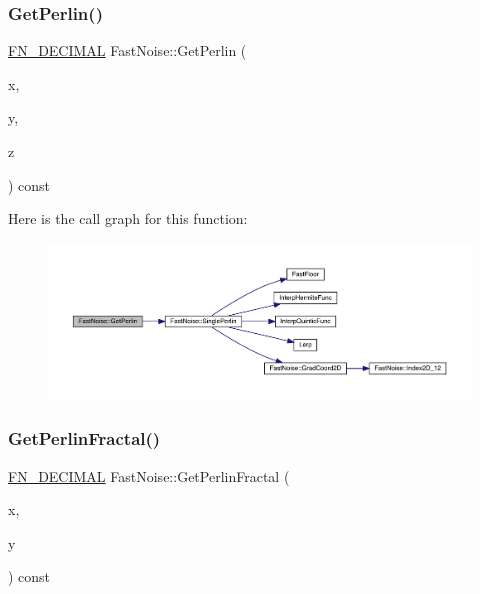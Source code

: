 \subsubsection{\texorpdfstring{Get\+Perlin()}{GetPerlin()}\hspace{0.1cm}{\footnotesize\ttfamily [2/2]}}
{\footnotesize\ttfamily \mbox{\hyperlink{_fast_noise_8h_a75a9ef6d2541c4921815b885bfd449c3}{F\+N\+\_\+\+D\+E\+C\+I\+M\+AL}} Fast\+Noise\+::\+Get\+Perlin (\begin{DoxyParamCaption}\item[{\mbox{\hyperlink{_fast_noise_8h_a75a9ef6d2541c4921815b885bfd449c3}{F\+N\+\_\+\+D\+E\+C\+I\+M\+AL}}}]{x,  }\item[{\mbox{\hyperlink{_fast_noise_8h_a75a9ef6d2541c4921815b885bfd449c3}{F\+N\+\_\+\+D\+E\+C\+I\+M\+AL}}}]{y,  }\item[{\mbox{\hyperlink{_fast_noise_8h_a75a9ef6d2541c4921815b885bfd449c3}{F\+N\+\_\+\+D\+E\+C\+I\+M\+AL}}}]{z }\end{DoxyParamCaption}) const}

Here is the call graph for this function\+:
\nopagebreak
\begin{figure}[H]
\begin{center}
\leavevmode
\includegraphics[width=350pt]{class_fast_noise_ac8379b662e050faf5302026616fc56af_cgraph}
\end{center}
\end{figure}
\mbox{\label{class_fast_noise_adc266f882b7128f39770bc79eae6b872}} 
\subsubsection{\texorpdfstring{Get\+Perlin\+Fractal()}{GetPerlinFractal()}\hspace{0.1cm}{\footnotesize\ttfamily [1/2]}}
{\footnotesize\ttfamily \mbox{\hyperlink{_fast_noise_8h_a75a9ef6d2541c4921815b885bfd449c3}{F\+N\+\_\+\+D\+E\+C\+I\+M\+AL}} Fast\+Noise\+::\+Get\+Perlin\+Fractal (\begin{DoxyParamCaption}\item[{\mbox{\hyperlink{_fast_noise_8h_a75a9ef6d2541c4921815b885bfd449c3}{F\+N\+\_\+\+D\+E\+C\+I\+M\+AL}}}]{x,  }\item[{\mbox{\hyperlink{_fast_noise_8h_a75a9ef6d2541c4921815b885bfd449c3}{F\+N\+\_\+\+D\+E\+C\+I\+M\+AL}}}]{y }\end{DoxyParamCaption}) const}

